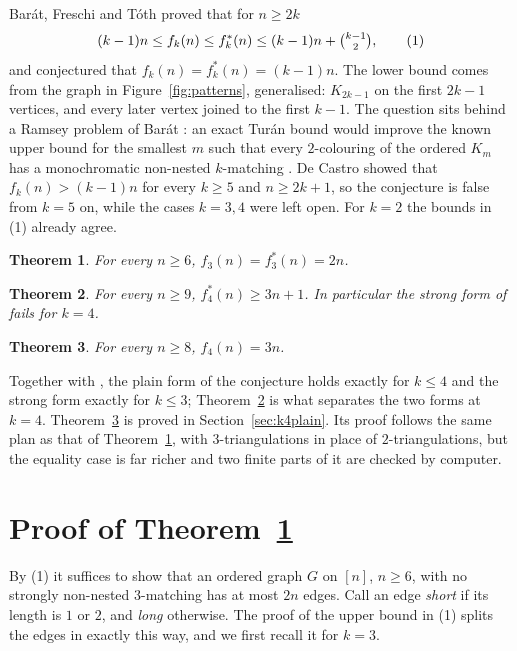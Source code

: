 \documentclass[11pt]{amsart}
\newtheorem{theorem}{Theorem}
\theoremstyle{definition}\newtheorem{problem}{Problem}
\theoremstyle{remark}\newtheorem*{remark}{Remark}
\begin{document}
Bar\'at, Freschi and T\'oth \cite{BFT} proved that for $n\ge2k$
\[
(k-1)n\le f_k(n)\le f^*_k(n)\le (k-1)n+\tbinom{k-1}{2}, \tag{1}
\]
and conjectured \cite[Conjecture~2.6]{BFT} that $f_k(n)=f^*_k(n)=(k-1)n$. The lower bound comes from the graph in
Figure~\ref{fig:patterns}, generalised: $K_{2k-1}$ on the first $2k-1$ vertices, and every later vertex joined to the
first $k-1$. The question sits behind a Ramsey problem of Bar\'at \cite{CC33,BGT}: an exact Tur\'an bound would improve
the known upper bound for the smallest $m$ such that every $2$-colouring of the ordered $K_m$ has a monochromatic
non-nested $k$-matching \cite[Lemma~3.3]{BFT}. De Castro \cite{dC} showed that $f_k(n)>(k-1)n$ for every $k\ge5$ and
$n\ge2k+1$, so the conjecture is false from $k=5$ on, while the cases $k=3,4$ were left open. For $k=2$ the bounds in
(1) already agree.

\begin{theorem}\label{thm:k3}
For every $n\ge6$, $f_3(n)=f^*_3(n)=2n$.
\end{theorem}

\begin{theorem}\label{thm:k4}
For every $n\ge9$, $f^*_4(n)\ge 3n+1$. In particular the strong form of \cite[Conjecture~2.6]{BFT} fails for $k=4$.
\end{theorem}

\begin{theorem}\label{thm:k4plain}
For every $n\ge8$, $f_4(n)=3n$.
\end{theorem}

Together with \cite{dC}, the plain form of the conjecture holds exactly for $k\le4$ and the strong form exactly for
$k\le3$; Theorem~\ref{thm:k4} is what separates the two forms at $k=4$. Theorem~\ref{thm:k4plain} is proved in
Section~\ref{sec:k4plain}. Its proof follows the same plan as that of Theorem~\ref{thm:k3}, with $3$-triangulations
in place of $2$-triangulations, but the equality case is far richer and two finite parts of it are checked by
computer.

\section{Proof of Theorem~\ref{thm:k3}}
By (1) it suffices to show that an ordered graph $G$ on $[n]$, $n\ge6$, with no strongly non-nested $3$-matching has
at most $2n$ edges. Call an edge \emph{short} if its length is $1$ or $2$, and \emph{long} otherwise. The proof of the
upper bound in (1) splits the edges in exactly this way, and we first recall it for $k=3$.
\end{document}
